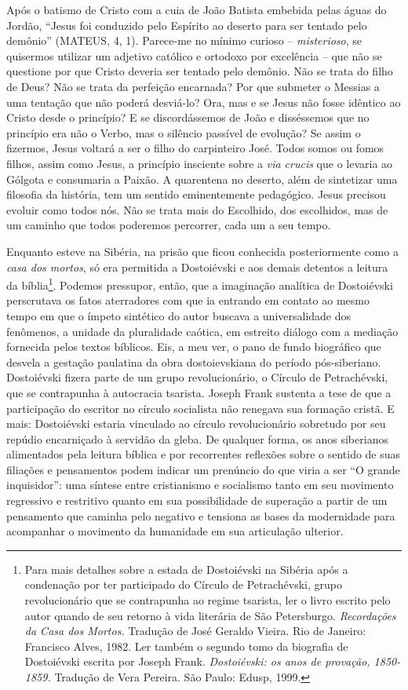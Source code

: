 Após o batismo de Cristo com a cuia de João Batista embebida pelas águas
do Jordão, ``Jesus foi conduzido pelo Espírito ao deserto para ser
tentado pelo demônio'' (MATEUS, 4, 1). Parece-me no mínimo curioso --
\emph{misterioso}, se quisermos utilizar um adjetivo católico e ortodoxo
por excelência -- que não se questione por que Cristo deveria ser
tentado pelo demônio. Não se trata do filho de Deus? Não se trata da
perfeição encarnada? Por que submeter o Messias a uma tentação que não
poderá desviá-lo? Ora, mas e se Jesus não fosse idêntico ao Cristo desde
o princípio? E se discordássemos de João e disséssemos que no princípio
era não o Verbo, mas o silêncio passível de evolução? Se assim o
fizermos, Jesus voltará a ser o filho do carpinteiro José. Todos somos
ou fomos filhos, assim como Jesus, a princípio insciente sobre a
\emph{via crucis} que o levaria ao Gólgota e consumaria a Paixão. A
quarentena no deserto, além de sintetizar uma filosofia da história, tem
um sentido eminentemente pedagógico. Jesus precisou evoluir como todos
nós. Não se trata mais do Escolhido, dos escolhidos, mas de um caminho
que todos poderemos percorrer, cada um a seu tempo.

Enquanto esteve na Sibéria, na prisão que ficou conhecida posteriormente
como a \emph{casa dos mortos}, só era permitida a Dostoiévski e aos
demais detentos a leitura da bíblia\footnote{Para mais detalhes sobre a
  estada de Dostoiévski na Sibéria após a condenação por ter participado
  do Círculo de Petrachévski, grupo revolucionário que se contrapunha ao
  regime tsarista, ler o livro escrito pelo autor quando de seu retorno
  à vida literária de São Petersburgo. \emph{Recordações da Casa dos
  Mortos.} Tradução de José Geraldo Vieira. Rio de Janeiro: Francisco
  Alves, 1982. Ler também o segundo tomo da biografia de Dostoiévski
  escrita por Joseph Frank. \emph{Dostoiévski: os anos de provação,
  1850-1859.} Tradução de Vera Pereira. São Paulo: Edusp, 1999.}.
Podemos pressupor, então, que a imaginação analítica de Dostoiévski
perscrutava os fatos aterradores com que ia entrando em contato ao mesmo
tempo em que o ímpeto sintético do autor buscava a universalidade dos
fenômenos, a unidade da pluralidade caótica, em estreito diálogo com a
mediação fornecida pelos textos bíblicos. Eis, a meu ver, o pano de
fundo biográfico que desvela a gestação paulatina da obra dostoievskiana
do período pós-siberiano. Dostoiévski fizera parte de um grupo
revolucionário, o Círculo de Petrachévski, que se contrapunha à
autocracia tsarista. Joseph Frank sustenta a tese de que a participação
do escritor no círculo socialista não renegava sua formação cristã. E
mais: Dostoiévski estaria vinculado ao círculo revolucionário sobretudo
por seu repúdio encarniçado à servidão da gleba. De qualquer forma, os
anos siberianos alimentados pela leitura bíblica e por recorrentes
reflexões sobre o sentido de suas filiações e pensamentos podem indicar
um prenúncio do que viria a ser ``O grande inquisidor'': uma síntese
entre cristianismo e socialismo tanto em seu movimento regressivo e
restritivo quanto em sua possibilidade de superação a partir de um
pensamento que caminha pelo negativo e tensiona as bases da modernidade
para acompanhar o movimento da humanidade em sua articulação ulterior.

